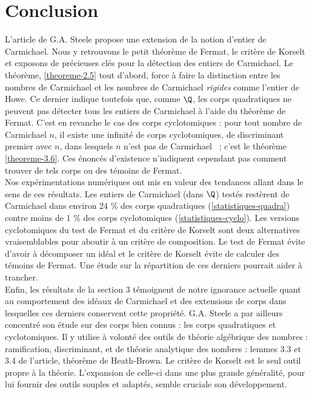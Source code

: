 \section*{Conclusion}

L'article de G.A. Steele propose une extension de la notion d'entier de Carmichael. Nous y retrouvons le petit théorème de Fermat, le critère de Korselt et exposons de précieuses clés pour la détection des entiers de Carmichael. Le théorème, \ref{theoreme-2.5} tout d'abord, force à faire la distinction entre les nombres de Carmichael et les nombres de Carmichael \emph{rigides} comme l'entier de Howe. Ce dernier indique toutefois que, comme $\Q$, les corps quadratiques ne peuvent pas détecter tous les entiers de Carmichael à l'aide du théorème de Fermat. C'est en revanche le cas des corps cyclotomiques : pour tout nombre de Carmichael $n$, il existe une infinité de corps cyclotomiques, de discriminant premier avec $n$, dans lesquels $n$ n'est pas de Carmichael ~; c'est le théorème \ref{theoreme-3.6}. Ces énoncés d'existence n'indiquent cependant pas comment trouver de tels corps ou des témoins de Fermat. \\

Nos expérimentations numériques ont mis en valeur des tendances allant dans le sens de ces résultats. Les entiers de Carmichael (dans $\Q$) testés restèrent de Carmichael dans environ 24 \% des corps quadratiques (\ref{statistiques-quadra}) contre moins de 1 \% des corps cyclotomiques (\ref{statistiques-cyclo}). Les versions cyclotomiques du test de Fermat et du critère de Korselt sont deux alternatives vraisemblables pour aboutir à un critère de composition. Le test de Fermat évite d'avoir à décomposer un idéal et le critère de Korselt évite de calculer des témoins de Fermat. Une étude sur la répartition de ces derniers pourrait aider à trancher. \\

Enfin, les résultats de la section 3 témoignent de notre ignorance actuelle quant au comportement des idéaux de Carmichael et des extensions de corps dans lesquelles ces derniers conservent cette propriété. G.A. Steele a par ailleurs concentré son étude sur des corps bien connus : les corps quadratiques et cyclotomiques. Il y utilise à volonté des outils de théorie algébrique des nombres : ramification, discriminant, et de théorie analytique des nombres : lemmes 3.3 et 3.4 de l'article, théorème de Heath-Brown. Le critère de Korselt est le seul outil propre à la théorie. L'expansion de celle-ci dans une plus grande généralité, pour lui fournir des outils souples et adaptés, semble cruciale son développement.
